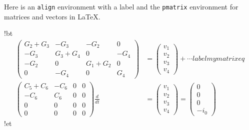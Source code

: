 \documentclass[%
oneside,                 %
final,                   %
10pt]{article}
\begin{document}
Here is an \texttt{align} environment with a label and the \texttt{pmatrix}
environment for matrices and vectors in {\LaTeX}.








































\blatexcod
!bt
\begin{align}
\begin{pmatrix}
G_2 + G_3 & -G_3 & -G_2 & 0 \\ 
-G_3 & G_3 + G_4 & 0 & -G_4 \\ 
-G_2 & 0 & G_1 + G_2 & 0 \\ 
0 & -G_4 & 0 & G_4
\end{pmatrix}
&=
\begin{pmatrix}
v_1 \\ 
v_2 \\ 
v_3 \\ 
v_4
\end{pmatrix}
+ \cdots
label{mymatrixeq}\\ 
\begin{pmatrix}
C_5 + C_6 & -C_6 & 0 & 0 \\ 
-C_6 & C_6 & 0 & 0 \\ 
0 & 0 & 0 & 0 \\ 
0 & 0 & 0 & 0
\end{pmatrix}
\frac{d}{dt} &=
\begin{pmatrix}
v_1 \\ 
v_2 \\ 
v_3 \\ 
v_4
\end{pmatrix} =
\begin{pmatrix}
0 \\ 
0 \\ 
0 \\ 
-i_0
\end{pmatrix}
\end{align}
!et
\end{document}
